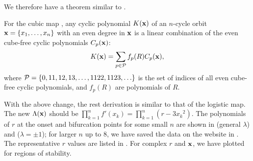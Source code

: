 \documentclass[twocolumn]{revtex4-1}
\begin{document}
We therefore have a theorem similar to .
%
%
\begin{theorem}
  For the cubic map ,
  any cyclic polynomial $K(\mathbf{x})$ of
  an $n$-cycle orbit
  $\mathbf{x} = \{x_1, \ldots, x_n\}$
  with an even degree in $\mathbf{x}$
  is a linear combination of
the even cube-free cyclic polynomials $C_p(\mathbf{x})$:
\[
  K(\mathbf{x}) = \sum_{p \in \mathcal P} f_p(R) C_p(\mathbf{x}),
\]
  where $\mathcal P = \{0, 11, 12, 13, \ldots, 1122, 1123, \ldots \}$ is
  the set of indices of all even cube-free cyclic polynomials,
  and $f_p(R)$ are polynomials of $R$.
  \label{thm:cubfree}
\end{theorem}






With the above change, the rest derivation is similar to that of the logistic map.
The new $\Lambda(\mathbf{x})$ should be
$\prod_{k=1}^n f'(x_k) = \prod_{k=1}^n (r - 3 {x_k}^2)$.
%
The polynomials of $r$
  at the onset and bifurcation points
for some small $n$ are shown in  (general $\lambda$)
and  ($\lambda = \pm1$);
for larger $n$ up to 8,
we have saved the data on the website in .
%
The representative $r$ values are listed in .
%
For complex $r$ and $\mathbf{x}$,
we have plotted  for regions of stability.
\end{document}
